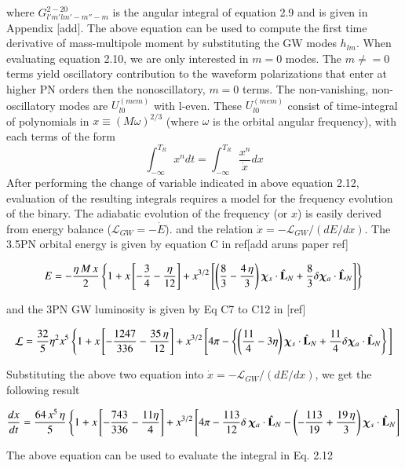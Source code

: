 \documentclass[prd,preprintnumbers,twocolumn,eqsecnum,floatfix,letter]{revtex4}
\begin{document}
where $G^{2-20}_{l'm'lm'-m''-m}$ is the angular integral of equation 2.9 and is given in Appendix [add]. The above equation can be used to compute the first time derivative of mass-multipole moment by substituting the GW modes $h_{lm}$. When evaluating equation 2.10, we are only interested in $m=0$ modes. The $m\neq=0$ terms yield oscillatory contribution to the waveform polarizations that enter at higher PN orders then the nonoscillatory, $m=0$ terms. The non-vanishing, non-oscillatory modes are $U^{(mem)}_{l0}$ with l-even. These $U^{(mem)}_{l0}$ consist of time-integral of polynomials in $x\equiv(M\omega)^{2/3}$ (where $\omega$ is the orbital angular frequency), with each terms of the form
\begin{equation}
\int_{-\infty}^{T_{R}} x^{n}dt=\int_{-\infty}^{T_{R}}\frac{x^{n}}{\dot{x}}dx
\end{equation}
After performing the change of variable indicated in above equation 2.12, evaluation of the resulting integrals requires a model for the frequency evolution of the binary. The adiabatic evolution of the frequency (or $x$) is easily derived from energy balance ($\mathcal{L}_{GW}=-\dot{E}$). and the relation $\dot{x}=-\mathcal{L}_{GW}/(dE/dx)$. The 3.5PN orbital energy is given by equation C in ref[add aruns paper ref]
\begin{widetext}
	\begin{align}\label{eq:E}
	E&=-\frac{\eta \, M \, x}{2}\left\{1 + x \left[-\frac{3}{4}-\frac{\eta}{12}\right] + x^{3/2}\left[\left(\frac{8}{3} - \frac{4 \, \eta}{3}\right)\bm{\chi}_s \cdot \hat{\mathbf{L}}_N + \frac{8}{3}\delta\bm{\chi}_a \cdot \hat{\mathbf{L}}_N\right]\right\} \nonumber \\
	\end{align}

and the 3PN GW luminosity is given by Eq C7 to C12 in [ref]

\begin{align}\label{eq:F}
\mathcal{L} &=\frac{32}{5}\eta^2x^5\left\{1 + x\left[-\frac{1247}{336}-\frac{35\,\eta}{12}\right] + x^{3/2}\left[4\pi-\left\{\left(\frac{11}{4}-3\eta\right)\bm{\chi}_s \cdot \hat{\mathbf{L}}_N +\frac{11}{4}\delta\bm{\chi}_a \cdot \hat{\mathbf{L}}_N\right\}\right.\right]\nonumber\\
\end{align}


Substituting the above two equation into $\dot{x}=-\mathcal{L}_{GW}/(dE/dx)$, we get the following result 

\begin{align}\label{eq:FbydE}
\frac{dx}{dt} & = \frac{64\, x^5  \, \eta}{5} \left\{1 + x \left[-\frac{743}{336}-\frac{11 \eta }{4} \right] 
+ x^{3/2} \left[4 \pi-\frac{113}{12}\delta \, \bm{\chi}_a \cdot \hat{\mathbf{L}}_N- \left(-\frac{113}{19} + \frac{19 \, \eta}{3}  \right)\bm{\chi}_s \cdot \hat{\mathbf{L}}_N \right] \right. \nonumber \\ 
\end{align}
\end{widetext}
The above equation can be used to evaluate the integral in Eq. 2.12
\end{document}
